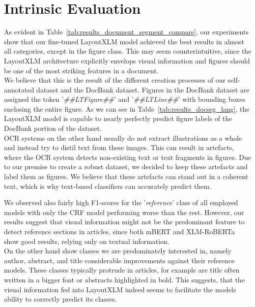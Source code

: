 \section{Intrinsic Evaluation}\label{sec:discussion_intrinsic}
As evident in Table~\ref{tab:results_document_segment_compare}, our experiments show that our fine-tuned LayoutXLM model achieved the best results in almost all categories, except in the figure class. This may seem counterintuitive, since the LayoutXLM architecture explicitly envelops visual information and figures should be one of the most striking features in a document.\\
We believe that this is the result of the different creation processes of our self-annotated dataset and the DocBank dataset. Figures in the DocBank dataset are assigned the token '\textit{\#\#LTFigure\#\#}' and '\textit{\#\#LTLine\#\#}' with bounding boxes enclosing the entire figure. As we can see in Table~\ref{tab:results_docseg_lang}, the LayoutXLM model is capable to nearly perfectly predict figure labels of the DocBank portion of the dataset.\\
OCR systems on the other hand usually do not extract illustrations as a whole and instead try to distil text from these images. This can result in artefacts, where the OCR system detects non-existing text or text fragments in figures. Due to our premise to create a robust dataset, we decided to keep these artefacts and label them as figures. We believe that these artefacts can stand out in a coherent text, which is why text-based classifiers can accurately predict them.\par
We observed also fairly high F1-scores for the '\textit{reference}' class of all employed models with only the CRF model performing worse than the rest. However, our results suggest that visual information might not be the predominant feature to detect reference sections in articles, since both mBERT and XLM-RoBERTa show good results, relying only on textual information.\\
On the other hand show classes we are predominately interested in, namely author, abstract, and title considerable improvements against their reference models. These classes typically protrude in articles, for example are title often written in a bigger font or abstracts highlighted in bold. This suggests, that the visual information fed into LayoutXLM indeed seems to facilitate the models ability to correctly predict its classes.\\

